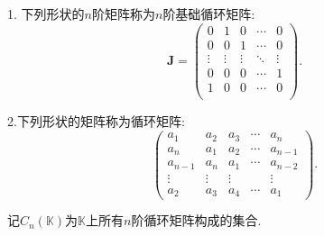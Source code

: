 \documentclass[lang=cn,newtx,10pt,scheme=chinese]{elegantbook}
\begin{document}
\begin{definition}[循环矩阵]\label{definition:循环矩阵}
1.    下列形状的$n$阶矩阵称为\(n\)阶基础循环矩阵:
\[ 
    \boldsymbol{J}=
\left( \begin{matrix}
0&		1&		0&		\cdots&		0\\
0&		0&		1&		\cdots&		0\\
\vdots&		\vdots&		\vdots&	\ddots&		\vdots\\
0&		0&		0&		\cdots&		1\\
1&		0&		0&		\cdots&		0\\
\end{matrix} \right).
\]

2.下列形状的矩阵称为循环矩阵:
\[
\begin{pmatrix}
a_1 & a_2 & a_3 & \cdots & a_n \\
a_n & a_1 & a_2 & \cdots & a_{n - 1} \\
a_{n - 1} & a_n & a_1 & \cdots & a_{n - 2} \\
\vdots & \vdots & \vdots & & \vdots \\
a_2 & a_3 & a_4 & \cdots & a_1
\end{pmatrix}.
\]
\end{definition}
\begin{note}
    记\(C_n(\mathbb{K})\)为\(\mathbb{K}\)上所有\(n\)阶循环矩阵构成的集合.
\end{note}
\end{document}
